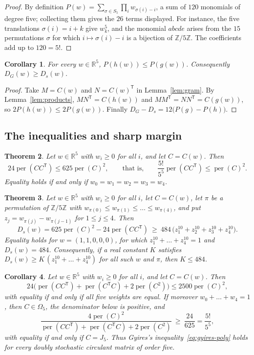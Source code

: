 \documentclass[11pt,a4paper]{article}
\newtheorem{theorem}{Theorem}[section]
\newtheorem{corollary}[theorem]{Corollary}
\theoremstyle{definition}
\theoremstyle{remark}
\newcommand{\R}{\mathbb{R}}
\newcommand{\Z}{\mathbb{Z}}
\newcommand{\per}{\operatorname{per}}
\newcommand{\T}{\mathsf{T}}
\begin{document}
\begin{proof}
By definition $P(w)=\sum_{\sigma\in S_5}\prod_iw_{\sigma(i)-i}$, a sum of $120$ monomials of degree five; collecting
them gives the $26$ terms displayed. For instance, the five translations $\sigma(i)=i+k$ give $w_k^5$, and the monomial
$abcde$ arises from the $15$ permutations $\sigma$ for which $i\mapsto\sigma(i)-i$ is a bijection of $\Z/5\Z$. The
coefficients add up to $120=5!$.
\end{proof}

\begin{corollary}\label{cor:gram}
For every $w\in\R^5$, $P(h(w))\le P(g(w))$. Consequently $D_G(w)\ge D_s(w)$.
\end{corollary}

\begin{proof}
Take $M=C(w)$ and $N=C(w)^\T$ in Lemma~\ref{lem:gram}. By Lemma~\ref{lem:products}, $MN^\T=C(h(w))$ and
$MM^\T=NN^\T=C(g(w))$, so $2P(h(w))\le2P(g(w))$. Finally $D_G-D_s=12\bigl(P(g)-P(h)\bigr)$.
\end{proof}

\subsection{The inequalities and sharp margin}\label{sec:results}

\begin{theorem}\label{thm:strong}
Let $w\in\R^5$ with $w_i\ge0$ for all $i$, and let $C=C(w)$. Then
\[
24\per(CC^\T)\le625\per(C)^2,\qquad\text{that is,}\qquad \frac{5!}{5^5}\per(CC^\T)\le\per(C)^2 .
\]
Equality holds if and only if $w_0=w_1=w_2=w_3=w_4$.
\end{theorem}

\begin{theorem}\label{thm:margin}
Let $w\in\R^5$ with $w_i\ge0$ for all $i$, let $C=C(w)$, let $\pi$ be a permutation of $\Z/5\Z$ with
$w_{\pi(0)}\le w_{\pi(1)}\le\dots\le w_{\pi(4)}$, and put $z_j=w_{\pi(j)}-w_{\pi(j-1)}$ for $1\le j\le4$. Then
\[
D_s(w)=625\per(C)^2-24\per(CC^\T)\ \ge\ 484\,\bigl(z_1^{10}+z_2^{10}+z_3^{10}+z_4^{10}\bigr).
\]
Equality holds for $w=(1,1,0,0,0)$, for which $z_1^{10}+\dots+z_4^{10}=1$ and $D_s(w)=484$. Consequently, if a real
constant $K$ satisfies $D_s(w)\ge K\,(z_1^{10}+\dots+z_4^{10})$ for all such $w$ and $\pi$, then $K\le484$.
\end{theorem}

\begin{corollary}\label{cor:gyires}
Let $w\in\R^5$ with $w_i\ge0$ for all $i$, and let $C=C(w)$. Then
\[
24\bigl(\per(CC^\T)+\per(C^\T C)+2\per(C^2)\bigr)\le2500\per(C)^2,
\]
with equality if and only if all five weights are equal. If moreover $w_0+\dots+w_4=1$, then $C\in\Omega_5$, the
denominator below is positive, and
\[
\frac{4\per(C)^2}{\per(CC^\T)+\per(C^\T C)+2\per(C^2)}\ \ge\ \frac{24}{625}=\frac{5!}{5^5},
\]
with equality if and only if $C=J_5$. Thus Gyires's inequality~\eqref{eq:gyires-poly} holds for every doubly stochastic circulant
matrix of order five.
\end{corollary}
\end{document}
